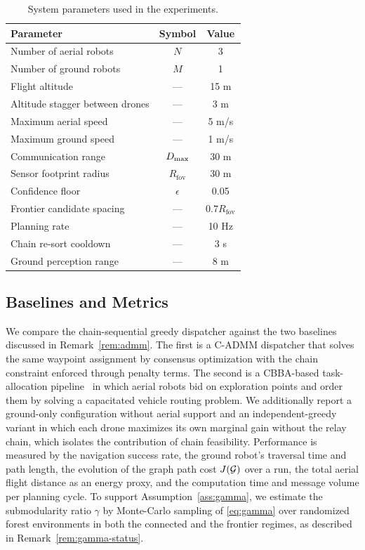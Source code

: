 \begin{table}[!t]
\caption{System parameters used in the experiments.}
\label{tab:params}
\centering
\begin{tabular}{lcc}
\toprule
Parameter & Symbol & Value \\
\midrule
Number of aerial robots & $N$ & 3 \\
Number of ground robots & $M$ & 1 \\
Flight altitude & --- & 15 m \\
Altitude stagger between drones & --- & 3 m \\
Maximum aerial speed & --- & 5 m/s \\
Maximum ground speed & --- & 1 m/s \\
Communication range & $D_{\max}$ & 30 m \\
Sensor footprint radius & $R_{\mathrm{fov}}$ & 30 m \\
Confidence floor & $\epsilon$ & 0.05 \\
Frontier candidate spacing & --- & $0.7 R_{\mathrm{fov}}$ \\
Planning rate & --- & 10 Hz \\
Chain re-sort cooldown & --- & 3 s \\
Ground perception range & --- & 8 m \\
\bottomrule
\end{tabular}
\end{table}

\subsection{Baselines and Metrics}

We compare the chain-sequential greedy dispatcher against the two baselines discussed in Remark~\ref{rem:admm}. The first is a C-ADMM dispatcher that solves the same waypoint assignment by consensus optimization with the chain constraint enforced through penalty terms. The second is a CBBA-based task-allocation pipeline~\cite{choi2009consensus} in which aerial robots bid on exploration points and order them by solving a capacitated vehicle routing problem. We additionally report a ground-only configuration without aerial support and an independent-greedy variant in which each drone maximizes its own marginal gain without the relay chain, which isolates the contribution of chain feasibility. Performance is measured by the navigation success rate, the ground robot's traversal time and path length, the evolution of the graph path cost $J(\mathcal{G})$ over a run, the total aerial flight distance as an energy proxy, and the computation time and message volume per planning cycle. To support Assumption~\ref{ass:gamma}, we estimate the submodularity ratio $\gamma$ by Monte-Carlo sampling of \eqref{eq:gamma} over randomized forest environments in both the connected and the frontier regimes, as described in Remark~\ref{rem:gamma-status}.

